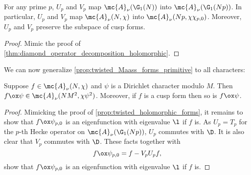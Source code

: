     \begin{lemma}\label{lem:twisted_Maass_lemma}
      For any prime $p$, $U_{p}$ and $V_{p}$ map $\mc{A}_{\nu}(\G_{1}(N))$ into $\mc{A}_{\nu}(\G_{1}(Np))$. In particular, $U_{p}$ and $V_{p}$ map $\mc{A}_{\nu}(N,\chi)$ into $\mc{A}_{\nu}(Np,\chi\chi_{p,0})$. Moreover, $U_{p}$ and $V_{p}$ preserve the subspace of cusp forms.
    \end{lemma}
    \begin{proof}
      Mimic the proof of \cref{thm:diamond_operator_decomposition_holomorphic}.
    \end{proof}

    We can now generalize \cref{prop:twisted_Maass_forms_primitive} to all characters:

    \begin{proposition}\label{prop:twisted_Maass_forms}
      Suppose $f \in \mc{A}_{\nu}(N,\chi)$ and $\psi$ is a Dirichlet character modulo $M$. Then $f \ox \psi \in \mc{A}_{\nu}(NM^{2},\chi\psi^{2})$. Moreover, if $f$ is a cusp form then so is $f \ox \psi$.
    \end{proposition}
    \begin{proof}
      Mimicking the proof of \cref{prop:twisted_holomorphic_forms}, it remains to show that $f \ox \psi_{p,0}$ is an eigenfunction with eigenvalue $\l$ if $f$ is. As $U_{p} = T_{p}$ for the $p$-th Hecke operator on $\mc{A}_{\nu}(\G_{1}(Np))$, $U_{p}$ commutes with $\D$. It is also clear that $V_{p}$ commutes with $\D$. These facts together with
      \[
        f \ox \psi_{p,0} = f-V_{p}U_{p}f,
      \]
      show that $f \ox \psi_{p,0}$ is an eigenfunction with eigenvalue $\l$ if $f$ is.
    \end{proof}